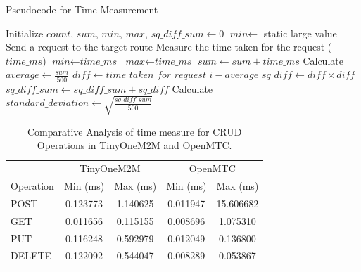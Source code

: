\documentclass[a4paper,fleqn]{cas-dc}
\begin{document}
\begin{algorithm}
\scriptsize
\caption{Pseudocode for Time Measurement}
\label{alg:time_measurement}
\begin{algorithmic}[1]
\State Initialize $\textit{count}$, $\textit{sum}$, $\textit{min}$, $\textit{max}$, $\textit{sq\_diff\_sum} \gets 0$
\State $\textit{min} \gets$ static large value
    \State Send a request to the target route
    \State Measure the time taken for the request ($\textit{time\_ms}$)
        \State $\textit{min} \gets \textit{time\_ms}$
    \EndIf
        \State $\textit{max} \gets \textit{time\_ms}$
    \EndIf
    \State $\textit{sum} \gets \textit{sum} + \textit{time\_ms}$
\EndFor
\State Calculate $\textit{average} \gets \frac{\textit{sum}}{500}$
    \State $\textit{diff} \gets \textit{time taken for request i} - \textit{average}$
    \State $\textit{sq\_diff} \gets \textit{diff} \times \textit{diff}$
    \State $\textit{sq\_diff\_sum} \gets \textit{sq\_diff\_sum} + \textit{sq\_diff}$
\EndFor
\State Calculate $\textit{standard\_deviation} \gets \sqrt{\frac{\textit{sq\_diff\_sum}}{500}}$
\end{algorithmic}
\end{algorithm}

\begin{table}
\scriptsize
\centering
\caption{Comparative Analysis of time measure for CRUD Operations in TinyOneM2M and OpenMTC.}
\label{tab:ComparativeAnalysis}
\begin{tabular}{lcccc}
\hline
& \multicolumn{2}{c}{TinyOneM2M} & \multicolumn{2}{c}{OpenMTC} \\
\cline{2-3} \cline{4-5}
Operation & Min (ms) & Max (ms) & Min (ms) & Max (ms) \\
\hline
POST & 0.123773 & 1.140625 & 0.011947 & 15.606682 \\
GET & 0.011656 & 0.115155 & 0.008696 & 1.075310 \\
PUT & 0.116248 & 0.592979 & 0.012049 & 0.136800 \\
DELETE & 0.122092 & 0.544047 & 0.008289 & 0.053867 \\
\hline
\end{tabular}
\end{table}
\end{document}
